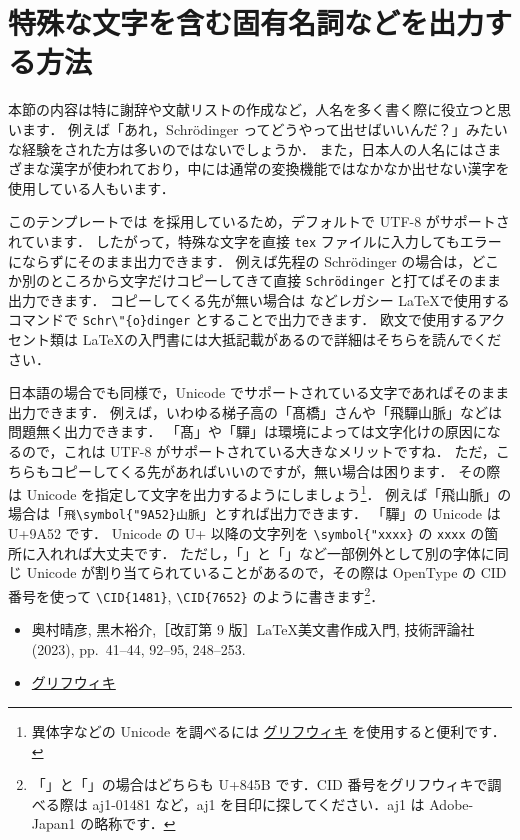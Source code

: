 \section{特殊な文字を含む固有名詞などを出力する方法}
\label{sec:unicode}

本節の内容は特に謝辞や文献リストの作成など，人名を多く書く際に役立つと思います．
例えば「あれ，Schrödinger ってどうやって出せばいいんだ？」みたいな経験をされた方は多いのではないでしょうか．
また，日本人の人名にはさまざまな漢字が使われており，中には通常の変換機能ではなかなか出せない漢字を使用している人もいます．

このテンプレートでは \LuaLaTeX を採用しているため，デフォルトで UTF-8 がサポートされています．
したがって，特殊な文字を直接 \verb|tex| ファイルに入力してもエラーにならずにそのまま出力できます．
例えば先程の Schrödinger の場合は，どこか別のところから文字だけコピーしてきて直接 \verb|Schrödinger| と打てばそのまま出力できます．
コピーしてくる先が無い場合は \pLaTeX などレガシー \LaTeX で使用するコマンドで \verb|Schr\"{o}dinger| とすることで出力できます．
欧文で使用するアクセント類は \LaTeX の入門書には大抵記載があるので詳細はそちらを読んでください．

日本語の場合でも同様で，Unicode でサポートされている文字であればそのまま出力できます．
例えば，いわゆる梯子高の「髙橋」さんや「飛驒山脈」などは問題無く出力できます．
「髙」や「驒」は環境によっては文字化けの原因になるので，これは UTF-8 がサポートされている大きなメリットですね．
ただ，こちらもコピーしてくる先があればいいのですが，無い場合は困ります．
その際は Unicode を指定して文字を出力するようにしましょう\footnote{異体字などの Unicode を調べるには \href{https://glyphwiki.org/wiki/}{グリフウィキ} を使用すると便利です．}．
例えば「飛山脈」の場合は「\verb|飛\symbol{"9A52}山脈|」とすれば出力できます．
「驒」の Unicode は U+9A52 です．
Unicode の U+ 以降の文字列を \verb|\symbol{"xxxx}| の \verb|xxxx| の箇所に入れれば大丈夫です．
ただし，「」と「」など一部例外として別の字体に同じ Unicode が割り当てられていることがあるので，その際は OpenType の CID 番号を使って \verb|\CID{1481}|, \verb|\CID{7652}| のように書きます\footnote{「」と「」の場合はどちらも U+845B です．CID 番号をグリフウィキで調べる際は aj1-01481 など，aj1 を目印に探してください．aj1 は Adobe-Japan1 の略称です．}．

\begin{tcolorbox}[title={第~\ref{ch:notation}~章の参考文献}, colback=yellow!5!white, colframe=yellow!75!black, coltitle=black]
    \begin{itemize}
        \item 奥村晴彦, 黒木裕介,［改訂第 9 版］\LaTeX 美文書作成入門, 技術評論社 (2023), pp.~41--44, 92--95, 248--253.
        \item \href{https://glyphwiki.org/wiki/}{グリフウィキ}
    \end{itemize}
\end{tcolorbox}


